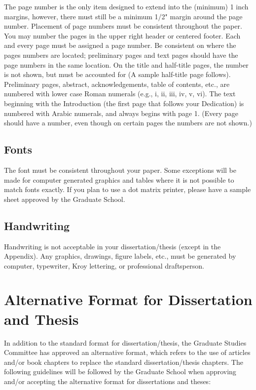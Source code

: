 The page number is the only item designed to extend into the (minimum) 1 inch margins, however, there must still be a minimum 1/2" margin around the page number. Placement of page numbers must be consistent throughout the paper. You may number the pages in the upper right header or centered footer. Each and every page must be assigned a page number. Be consistent on where the pages numbers are located; preliminary pages and text pages should have the page numbers in the same location. On the title and half-title pages, the number is not shown, but must be accounted for (A sample half-title page follows).
Preliminary pages, abstract, acknowledgements, table of contents, etc., are numbered with lower case Roman numerals (e.g., i, ii, iii, iv, v, vi). The text beginning with the Introduction (the first page that follows your Dedication) is numbered with Arabic numerals, and always begins with page 1. (Every page should have a number, even though on certain pages the numbers are not shown.)

\subsection{Fonts}

The font must be consistent throughout your paper. Some exceptions will be made for computer generated graphics and tables where it is not possible to match fonts exactly. If you plan to use a dot matrix printer, please have a sample sheet approved by the Graduate School.

\subsection{Handwriting}

Handwriting is not acceptable in your dissertation/thesis (except in the Appendix). Any graphics, drawings, figure labels, etc., must be generated by computer, typewriter, Kroy lettering, or professional draftsperson.

\section{Alternative Format for Dissertation and Thesis}

In addition to the standard format for dissertation/thesis, the Graduate Studies Committee has approved an alternative format, which refers to the use of articles and/or book chapters to replace the standard dissertation/thesis chapters. The following guidelines will be followed by the Graduate School when approving and/or accepting the alternative format for dissertations and theses:


